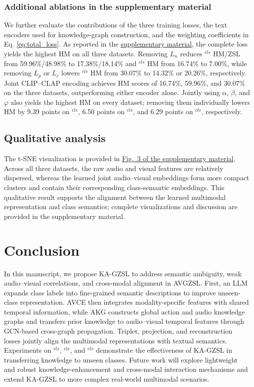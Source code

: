 \documentclass[10pt,journal,twoside]{IEEEtran}
\begin{document}
\subsubsection{Additional ablations in the supplementary material}
We further evaluate the contributions of the three training losses, the text encoders used for knowledge-graph construction, and the weighting coefficients in Eq. \eqref{eq:total_loss}. As reported in the \href{run:Supplementary_Materials.pdf}{supplementary material}, the complete loss yields the highest HM on all three datasets. Removing $L_n$ reduces $^{\textit{cls}}$ HM/ZSL from 59.96\%/48.98\% to 17.38\%/18.14\% and $^{\textit{cls}}$ HM from 16.74\% to 7.00\%, while removing $L_p$ or $L_c$ lowers $^{\textit{cls}}$ HM from 30.07\% to 14.32\% or 20.26\%, respectively. Joint CLIP--CLAP encoding achieves HM scores of 16.74\%, 59.96\%, and 30.07\% on the three datasets, outperforming either encoder alone. Jointly using $\alpha$, $\beta$, and $\varphi$ also yields the highest HM on every dataset; removing them individually lowers HM by 9.39 points on $^{\textit{cls}}$, 6.50 points on $^{\textit{cls}}$, and 6.29 points on $^{\textit{cls}}$, respectively.


\subsection{Qualitative analysis}
The t-SNE\cite{46} visualization is provided in \href{run:Supplementary_Materials.pdf}{Fig.~3 of the supplementary material}. Across all three datasets, the raw audio and visual features are relatively dispersed, whereas the learned joint audio--visual embeddings form more compact clusters and contain their corresponding class-semantic embeddings. This qualitative result supports the alignment between the learned multimodal representation and class semantics; complete visualizations and discussion are provided in the supplementary material.


\section{Conclusion}
In this manuscript, we propose KA-GZSL to address semantic ambiguity, weak audio--visual correlations, and cross-modal alignment in AVGZSL. First, an LLM expands class labels into fine-grained semantic descriptions to improve unseen-class representation. AVCE then integrates modality-specific features with shared temporal information, while AKG constructs global action and audio knowledge graphs and transfers prior knowledge to audio--visual temporal features through GCN-based cross-graph propagation. Triplet, projection, and reconstruction losses jointly align the multimodal representations with textual semantics. Experiments on $^{\textit{cls}}$, $^{\textit{cls}}$, and $^{\textit{cls}}$ demonstrate the effectiveness of KA-GZSL in transferring knowledge to unseen classes. Future work will explore lightweight and robust knowledge-enhancement and cross-modal interaction mechanisms and extend KA-GZSL to more complex real-world multimodal scenarios.
\end{document}
